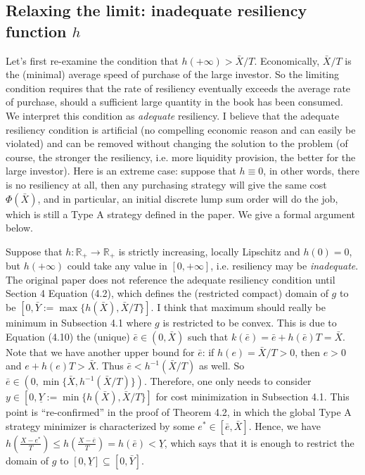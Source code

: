 \documentclass[openany,oneside]{article}
\theoremstyle{definition}
\theoremstyle{remark}
\begin{document}
\subsection{Relaxing the limit: inadequate resiliency function $h$}
Let's first re-examine the condition that $h(+\infty) > \bar{X}/T$. Economically, $\bar{X}/T$ is the (minimal) average speed of purchase of the large investor. So the limiting condition requires that the rate of resiliency eventually exceeds the average rate of purchase, should a sufficient large quantity in the book has been consumed. We interpret this condition as \emph{adequate} resiliency. I believe that the adequate resiliency condition is artificial (no compelling economic reason and can easily be violated)  and can be removed without changing the solution to the problem (of course, the stronger the resiliency, i.e. more liquidity provision, the better for the large investor). Here is an extreme case: suppose that $h\equiv 0$, in other words, there is no resiliency at all, then any purchasing strategy will give the same cost $\Phi(\bar{X})$, and in particular, an initial discrete lump sum order will do the job, which is still a Type A strategy defined in the paper. We give a formal argument below.

Suppose that $h:\mathbb{R}_+ \to \mathbb{R}_+$ is strictly increasing, locally Lipschitz and $h(0)=0$, but $h(+\infty)$ could take any value in $[0,+\infty]$, i.e. resiliency may be \emph{inadequate}. The original paper does not reference the adequate resiliency condition until Section 4 Equation (4.2), which defines the (restricted compact) domain of $g$ to be $\left[0, \bar{Y}:=\max\{h(\bar{X}), \bar{X}/T\} \right]$. I think that maximum should really be minimum in Subsection 4.1 where $g$ is restricted to be convex. This is due to Equation (4.10) the (unique) $\bar{e} \in (0,\bar{X})$ such that $k(\bar{e}) = \bar{e} + h(\bar{e}) T = \bar{X}$. Note that we have another upper bound for $\bar{e}$: if $h(e) = \bar{X}/T >0$, then $e>0$ and $e+h(e)T > \bar{X}$. Thus $\bar{e} < h^{-1}(\bar{X}/T)$ as well. So $\bar{e} \in \left(0, \min\{\bar{X}, h^{-1}(\bar{X}/T)\} \right)$. Therefore, one only needs to consider $y\in \left[0, \underline{Y}:=\min\{h(\bar{X}), \bar{X}/T\} \right]$ for cost minimization in Subsection 4.1. This point is ``re-confirmed'' in the proof of Theorem 4.2, in which the global Type A strategy minimizer is characterized by some $e^\ast \in [\bar{e}, \bar{X}]$. Hence, we have $h\left(\frac{X-e^\ast}{T}\right) \le h\left(\frac{X-\bar{e}}{T}\right) = h(\bar{e}) < \underline{Y}$, which says that it is enough to restrict the domain of $g$ to $[0,\underline{Y}] \subseteq [0,\bar{Y}]$.
\end{document}
